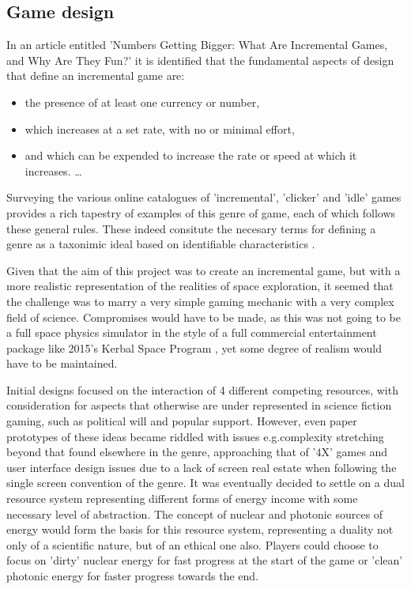 \documentclass[twoside]{bhamthesis}
\begin{document}
\subsection{Game design}

In an article entitled 'Numbers Getting Bigger: What Are Incremental Games, and Why Are They Fun?' \cite{king_numbers_2015} it is identified that the fundamental aspects of design that define an incremental game are:
\begin{itemize}
\item the presence of at least one currency or number, 
\item which increases at a set rate, with no or minimal effort, 
\item and which can be expended to increase the rate or speed at which it increases. \ldots
\end{itemize}
 
Surveying the various online catalogues of 'incremental', 'clicker' and 'idle' games provides a rich tapestry of examples of this genre of game, each of which follows these general rules. These indeed consitute the necesary terms for defining a genre as a taxonimic ideal based on identifiable characteristics \cite{clarke_why_2017}.

Given that the aim of this project was to create an incremental game, but with a more realistic representation of the realities of space exploration, it seemed that the challenge was to marry a very simple gaming mechanic with a very complex field of science. Compromises would have to be made, as this was not going to be a full space physics simulator in the style of a full commercial entertainment package like 2015's Kerbal Space Program \cite{squad_kerbal_2015}, yet some degree of realism would have to be maintained. 

Initial designs focused on the interaction of 4 different competing resources, with consideration for aspects that otherwise are under represented in science fiction gaming, such as political will and popular support. However, even paper prototypes of these ideas became riddled with issues e.g.complexity stretching beyond that found elsewhere in the genre, approaching that of '4X' games \cite{gunn_taxonomy_2009} and user interface design issues due to a lack of screen real estate when following the single screen convention of the genre. It was eventually decided to settle on a dual resource system representing different forms of energy income with some necessary level of abstraction. The concept of nuclear and photonic sources of energy would form the basis for this resource system, representing a duality not only of a scientific nature, but of an ethical one also. Players could choose to focus on 'dirty' nuclear energy for fast progress at the start of the game or 'clean' photonic energy for faster progress towards the end.
\end{document}
